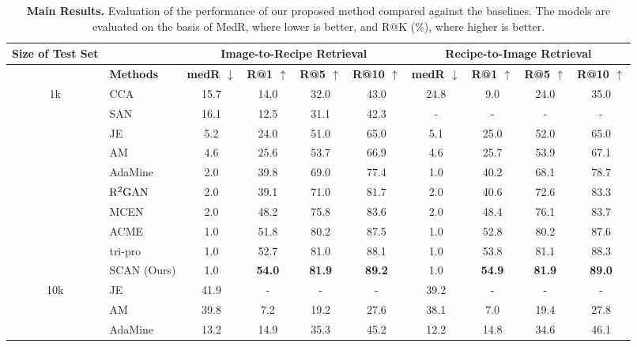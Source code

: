 \documentclass[journal]{IEEEtran}
\begin{document}
\begin{table*}[h!]
  \centering
    \caption{\textbf{Main Results.} Evaluation of the performance of our proposed method compared against the baselines. The models are evaluated on the basis of MedR, where lower is better, and R@K (\%), where higher is better.}
  \begin{tabular}{clcccccccc}
  \toprule
   \textbf{Size of Test Set} && \multicolumn{4}{c}{\textbf{Image-to-Recipe Retrieval}} & \multicolumn{4}{c}{\textbf{Recipe-to-Image Retrieval} }\\
    \midrule
    \multicolumn{1}{c}{} & \textbf{Methods} & \textbf{medR $\downarrow$} & \textbf{R@1 $\uparrow$} &\textbf{R@5 $\uparrow$}& \textbf{R@10 $\uparrow$} &  \textbf{medR $\downarrow$} & \textbf{R@1 $\uparrow$} & \textbf{R@5 $\uparrow$}& \textbf{R@10 $\uparrow$} \\
    \midrule
	\multirow{10}{*}{{1k}} 
        &CCA \cite{hotelling1936relations}& 15.7 & 14.0 & 32.0 & 43.0 & 24.8 & 9.0 & 24.0 & 35.0 \\
        &SAN \cite{chen2017cross}& 16.1 & 12.5 & 31.1 & 42.3 & - & - & - & -\\
        &JE \cite{salvador2017learning}& 5.2 & 24.0 & 51.0 & 65.0 & 5.1 & 25.0 & 52.0 & 65.0  \\
        &AM \cite{chen2018deep}& 4.6 & 25.6 & 53.7 & 66.9 & 4.6 & 25.7 & 53.9 & 67.1  \\
        &AdaMine \cite{carvalho2018cross}& 2.0 & 39.8 & 69.0 & 77.4 & 1.0 & 40.2 & 68.1 & 78.7 \\
        &$\rm {R^2 GAN}$ ~\cite{zhu2019r2gan} & 2.0 & 39.1 & 71.0 & 81.7 & 2.0 & 40.6 & 72.6 & 83.3 \\
        &MCEN \cite{fu2020mcen} & 2.0 & 48.2 & 75.8 & 83.6 & 2.0 & 48.4 & 76.1 & 83.7 \\
        &ACME \cite{wang2019learning} & 1.0 & 51.8 & 80.2 & 87.5 & 1.0 & 52.8 & 80.2 & 87.6 \\
        &tri-pro \cite{zan2020sentence} & 1.0 & 52.7 & 81.0 & 88.1 & 1.0 & 53.8 & 81.1 & 88.3 \\
        &SCAN (Ours) & 1.0 & \textbf{54.0}  & \textbf{81.9}  & \textbf{89.2}  & 1.0 & \textbf{54.9}  & \textbf{81.9}  & \textbf{89.0} \\
    \midrule
	\multirow{8}{*}{{10k}} 
	& JE \cite{salvador2017learning} & 41.9 & - & - & - & 39.2 & - & - & - \\
	&AM \cite{chen2018deep}& 39.8 & 7.2 & 19.2 & 27.6 & 38.1 & 7.0 & 19.4 & 27.8  \\ 
    &AdaMine \cite{carvalho2018cross}& 13.2 & 14.9 & 35.3 & 45.2 & 12.2 & 14.8 & 34.6 & 46.1\\

\end{tabular}
\end{table*}
\end{document}

